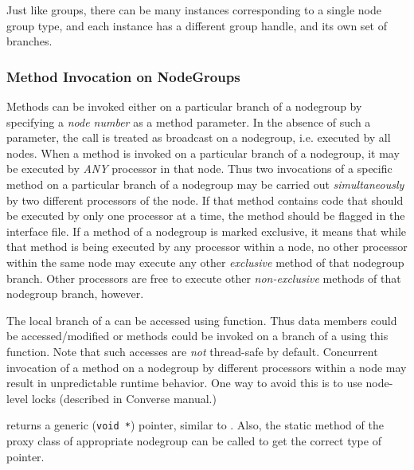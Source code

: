 Just like groups, there can be many instances corresponding to a single node
group type, and each instance has a different group handle, and its own set of
branches.


\subsubsection{Method Invocation on NodeGroups}

Methods can be invoked either on a particular branch of a
nodegroup by specifying a {\em node number} as a method
parameter. In the absence of such a parameter, the call is treated as broadcast
on a nodegroup, i.e. executed by all nodes. When a method is
invoked on a particular branch of a nodegroup,
it may be executed by {\em ANY} processor in that node. Thus two invocations of
a specific method on a particular branch of a
nodegroup may be carried out {\em simultaneously} by two
different processors of the node. If that method contains code that should be
executed by only one processor at a time, the method should be flagged
 in the interface file. If a method  of a
nodegroup  is marked exclusive, it means that while that method is being
executed by any processor within a node, no other processor within the same
node may execute any other {\em exclusive} method of that
nodegroup branch.  Other processors are free to
execute other {\em non-exclusive} methods of that nodegroup
branch, however.

The local branch of a  can be accessed using
 function. Thus data members could be accessed/modified
or methods could be invoked on a branch of a  using
this function. Note that such accesses are {\em not} thread-safe by default.
Concurrent invocation of a method on a nodegroup by different
processors within a node may result in unpredictable runtime behavior.  One way
to avoid this is to use node-level locks (described in Converse manual.)

 returns a generic ({\tt void *}) pointer, similar to
.  Also, the static method  of the
proxy class of appropriate nodegroup can be called to get the
correct type of pointer.
